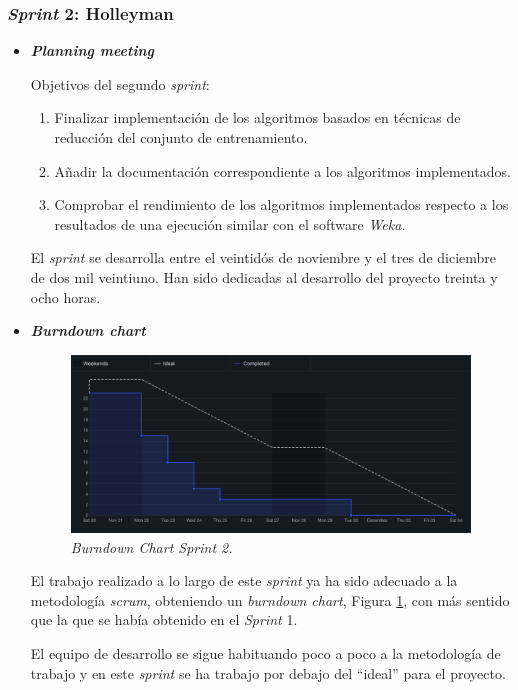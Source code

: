 \subsubsection{\textit{Sprint} 2: Holleyman}
\begin{itemize}
\item \textbf{\textit{Planning meeting}}

Objetivos del segundo \textit{sprint}:
\begin{enumerate}
\item Finalizar implementación de los algoritmos basados en técnicas de reducción del conjunto de entrenamiento.
\item Añadir la documentación correspondiente a los algoritmos implementados.
\item Comprobar el rendimiento de los algoritmos implementados respecto a los resultados de una ejecución similar con el software \textit{Weka}.
\end{enumerate}
El \textit{sprint} se desarrolla entre el veintidós de noviembre y el tres de diciembre de dos mil veintiuno. Han sido dedicadas al desarrollo del proyecto treinta y ocho horas.

\item \textbf{\textit{Burndown chart}}
\begin{figure}
\begin{center}
\includegraphics[width=\textwidth]{../img/anexos/sprints/BD-Sprint2}
\caption{\textit{Burndown Chart Sprint 2.}}\label{fig:BD-Sprint2}
\end{center}
\end{figure}

El trabajo realizado a lo largo de este \textit{sprint} ya ha sido adecuado a la metodología \textit{scrum}, obteniendo un \textit{burndown chart}, Figura \ref{fig:BD-Sprint2}, con más sentido que la que se había obtenido en el \textit{Sprint } 1. 

El equipo de desarrollo se sigue habituando poco a poco a la metodología de trabajo y en este \textit{sprint} se ha trabajo por debajo del ``ideal'' para el proyecto. 


\end{itemize}

